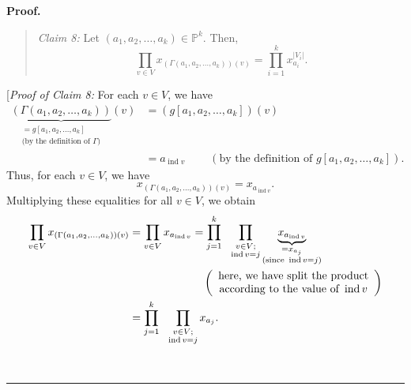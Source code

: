 \documentclass[numbers=enddot,12pt,final,onecolumn,notitlepage]{scrartcl}%
\numberwithin{exer}{section}
\theoremstyle{definition}
\newenvironment{statement}{\begin{quote}}{\end{quote}}
\newenvironment{proof}[1][Proof]{\noindent\textbf{#1.} }{\ \rule{0.5em}{0.5em}}
\let\prodnonlimits\prod
\renewcommand{\prod}{\prodnonlimits\limits}
\newenvironment{verlong}{}{}
\begin{document}
\begin{verlong}
\begin{proof}
\begin{statement}
\textit{Claim 8:} Let $\left(  a_{1},a_{2},\ldots,a_{k}\right)  \in
\mathbb{P}^{k}$. Then,%
\[
\prod_{v\in V}x_{\left(  \Gamma\left(  a_{1},a_{2},\ldots,a_{k}\right)
\right)  \left(  v\right)  }=\prod_{i=1}^{k}x_{a_{i}}^{\left\vert
V_{i}\right\vert }.
\]

\end{statement}

[\textit{Proof of Claim 8:} For each $v\in V$, we have%
\begin{align*}
\underbrace{\left(  \Gamma\left(  a_{1},a_{2},\ldots,a_{k}\right)  \right)
}_{\substack{=g\left[  a_{1},a_{2},\ldots,a_{k}\right]  \\\text{(by the
definition of }\Gamma\text{)}}}\left(  v\right)   &  =\left(  g\left[
a_{1},a_{2},\ldots,a_{k}\right]  \right)  \left(  v\right) \\
&  =a_{\operatorname*{ind}v}\ \ \ \ \ \ \ \ \ \ \left(  \text{by the
definition of }g\left[  a_{1},a_{2},\ldots,a_{k}\right]  \right)  .
\end{align*}
Thus, for each $v\in V$, we have%
\[
x_{\left(  \Gamma\left(  a_{1},a_{2},\ldots,a_{k}\right)  \right)  \left(
v\right)  }=x_{a_{\operatorname*{ind}v}}.
\]
Multiplying these equalities for all $v\in V$, we obtain%
\begin{align}
\prod_{v\in V}x_{\left(  \Gamma\left(  a_{1},a_{2},\ldots,a_{k}\right)
\right)  \left(  v\right)  }  &  =\prod_{v\in V}x_{a_{\operatorname*{ind}v}%
}=\prod_{j=1}^{k}\ \ \prod_{\substack{v\in V;\\\operatorname*{ind}%
v=j}}\underbrace{x_{a_{\operatorname*{ind}v}}}_{\substack{=x_{a_{j}%
}\\\text{(since }\operatorname*{ind}v=j\text{)}}}\nonumber\\
&  \ \ \ \ \ \ \ \ \ \ \ \ \ \ \ \ \ \ \ \ \left(
\begin{array}
[c]{c}%
\text{here, we have split the product}\\
\text{according to the value of }\operatorname*{ind}v
\end{array}
\right) \nonumber\\
&  =\prod_{j=1}^{k}\ \ \prod_{\substack{v\in V;\\\operatorname*{ind}%
v=j}}x_{a_{j}}. \label{pf.lem.ptype-as-sum.c8.pf.1}%
\end{align}



\end{proof}
\end{verlong}
\end{document}
